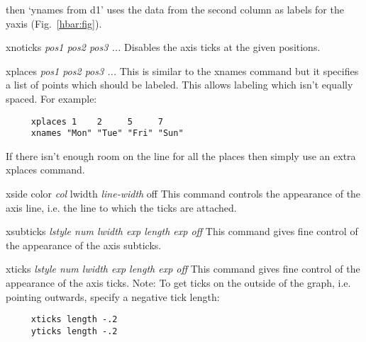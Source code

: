 \begin{commanddescription}
\noindent{}then `{\sf ynames from d1}' uses the data from the second column as labels for the yaxis (Fig.~\ref{hbar:fig}).

\item[{\sf xnoticks {\it pos1 pos2 pos3 ...}}]
Disables the axis ticks at the given positions.

\item[{\sf xplaces {\it pos1 pos2 pos3 ...}}  ]
This is similar to the xnames command but it specifies a list of points
which should be labeled.  This allows labeling which isn't equally
spaced. For example:

\begin{Verbatim}
     xplaces 1    2     5     7
     xnames "Mon" "Tue" "Fri" "Sun"
\end{Verbatim}

If there isn't enough room on the line for all the places then simply
use an extra {\sf xplaces} command.

\item[{\sf xside color {\it col} lwidth {\it line-width} off  } ]
This command controls the appearance of the axis line, i.e. the line
to which the ticks are attached.

\item[{\sf xsubticks {\it {\sf lstyle} num  {\sf lwidth} exp {\sf length} exp  {\sf off}}} ]
This command gives fine control of the appearance of the axis subticks.

\item[{\sf xticks {\it {\sf lstyle} num {\sf lwidth} exp {\sf length} exp {\sf off}}} ]
This command gives fine control of the appearance of the axis ticks.
Note: To get ticks on the outside of the graph, i.e. pointing outwards,
specify a negative tick length:

\preglecode{}
\begin{Verbatim}
     xticks length -.2
     yticks length -.2
\end{Verbatim}
\postglecode{}


\end{commanddescription}
